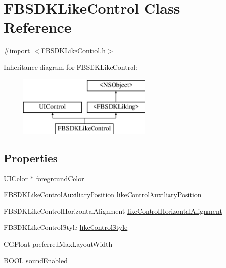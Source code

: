 \hypertarget{interface_f_b_s_d_k_like_control}{}\section{F\+B\+S\+D\+K\+Like\+Control Class Reference}
\label{interface_f_b_s_d_k_like_control}


{\ttfamily \#import $<$F\+B\+S\+D\+K\+Like\+Control.\+h$>$}

Inheritance diagram for F\+B\+S\+D\+K\+Like\+Control\+:\begin{figure}[H]
\begin{center}
\leavevmode
\includegraphics[height=3.000000cm]{interface_f_b_s_d_k_like_control}
\end{center}
\end{figure}
\subsection*{Properties}
\begin{DoxyCompactItemize}
\item 
U\+I\+Color $\ast$ \hyperlink{interface_f_b_s_d_k_like_control_a078c28c8d5545d68a6887dc6ce3cd32d}{foreground\+Color}
\item 
F\+B\+S\+D\+K\+Like\+Control\+Auxiliary\+Position \hyperlink{interface_f_b_s_d_k_like_control_a3084afe9f906160458653d82544dd772}{like\+Control\+Auxiliary\+Position}
\item 
F\+B\+S\+D\+K\+Like\+Control\+Horizontal\+Alignment \hyperlink{interface_f_b_s_d_k_like_control_a09b382f7e6805a15fc7eaeaa0ebb8788}{like\+Control\+Horizontal\+Alignment}
\item 
F\+B\+S\+D\+K\+Like\+Control\+Style \hyperlink{interface_f_b_s_d_k_like_control_a4e8264601868efeebbbb247892f95240}{like\+Control\+Style}
\item 
C\+G\+Float \hyperlink{interface_f_b_s_d_k_like_control_a19bcd198e1f6697fa9740c82fbd00de9}{preferred\+Max\+Layout\+Width}
\item 
B\+O\+O\+L \hyperlink{interface_f_b_s_d_k_like_control_af2293652063a0b1e8e3d8ba73b343d1c}{sound\+Enabled}
\end{DoxyCompactItemize}


